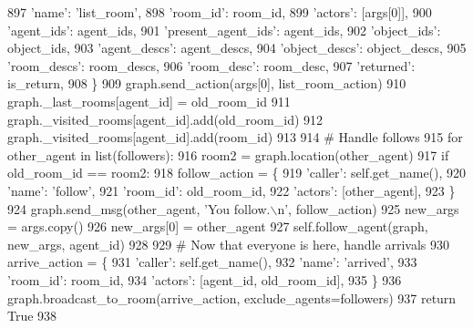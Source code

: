 \begin{DoxyCode}
897             \textcolor{stringliteral}{'name'}: \textcolor{stringliteral}{'list\_room'},
898             \textcolor{stringliteral}{'room\_id'}: room\_id,
899             \textcolor{stringliteral}{'actors'}: [args[0]],
900             \textcolor{stringliteral}{'agent\_ids'}: agent\_ids,
901             \textcolor{stringliteral}{'present\_agent\_ids'}: agent\_ids,
902             \textcolor{stringliteral}{'object\_ids'}: object\_ids,
903             \textcolor{stringliteral}{'agent\_descs'}: agent\_descs,
904             \textcolor{stringliteral}{'object\_descs'}: object\_descs,
905             \textcolor{stringliteral}{'room\_descs'}: room\_descs,
906             \textcolor{stringliteral}{'room\_desc'}: room\_desc,
907             \textcolor{stringliteral}{'returned'}: is\_return,
908         \}
909         graph.send\_action(args[0], list\_room\_action)
910         graph.\_last\_rooms[agent\_id] = old\_room\_id
911         graph.\_visited\_rooms[agent\_id].add(old\_room\_id)
912         graph.\_visited\_rooms[agent\_id].add(room\_id)
913 
914         \textcolor{comment}{# Handle follows}
915         \textcolor{keywordflow}{for} other\_agent \textcolor{keywordflow}{in} list(followers):
916             room2 = graph.location(other\_agent)
917             \textcolor{keywordflow}{if} old\_room\_id == room2:
918                 follow\_action = \{
919                     \textcolor{stringliteral}{'caller'}: self.get\_name(),
920                     \textcolor{stringliteral}{'name'}: \textcolor{stringliteral}{'follow'},
921                     \textcolor{stringliteral}{'room\_id'}: old\_room\_id,
922                     \textcolor{stringliteral}{'actors'}: [other\_agent],
923                 \}
924                 graph.send\_msg(other\_agent, \textcolor{stringliteral}{'You follow.\(\backslash\)n'}, follow\_action)
925                 new\_args = args.copy()
926                 new\_args[0] = other\_agent
927                 self.follow\_agent(graph, new\_args, agent\_id)
928 
929         \textcolor{comment}{# Now that everyone is here, handle arrivals}
930         arrive\_action = \{
931             \textcolor{stringliteral}{'caller'}: self.get\_name(),
932             \textcolor{stringliteral}{'name'}: \textcolor{stringliteral}{'arrived'},
933             \textcolor{stringliteral}{'room\_id'}: room\_id,
934             \textcolor{stringliteral}{'actors'}: [agent\_id, old\_room\_id],
935         \}
936         graph.broadcast\_to\_room(arrive\_action, exclude\_agents=followers)
937         \textcolor{keywordflow}{return} \textcolor{keyword}{True}
938 
\end{DoxyCode}
\mbox{\label{classlight__chats_1_1graph_1_1MoveAgentFunction_a41f3e48e12425eab0bfc6cd5b8f3de0a}} 
